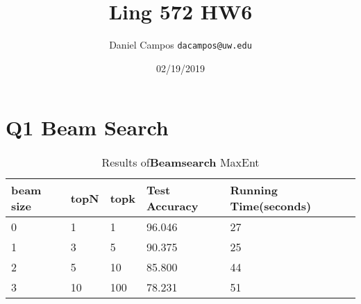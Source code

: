 \documentclass[11pt]{article}
\begin{document}
\title{Ling 572 HW6}
\author{Daniel Campos  \tt {dacampos@uw.edu}}
\date{02/19/2019}
\maketitle 
\section{ Q1 Beam Search}
\begin{table}[h]
\centering
\caption{Results of{\bf Beamsearch} MaxEnt}
\label{table1}
\begin{tabular}{|l|l|l|l|l|} \hline
beam size & topN & topk & Test Accuracy & Running Time(seconds) \\ \hline
0 & 1 & 1 & 96.046& 27 \\ \hline
1 & 3 & 5 & 90.375  & 25\\ \hline
2 & 5 & 10 & 85.800 & 44\\ \hline
3 & 10 & 100 &  78.231 & 51\\ \hline
\end{tabular}
\end{table}
\end{document}
